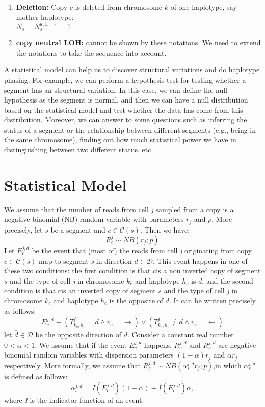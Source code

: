 \documentclass[12pt]{article}
\renewcommand{\c}{c} %
\newcommand{\C}{\mathcal{C}} %
\newcommand{\CN}{N} %
\renewcommand{\i}{v} %
\newcommand{\RC}{R} %
\renewcommand{\d}{d} %
\newcommand{\D}{\mathcal{D}} %
\newcommand{\chr}{k}
\newcommand{\h}{h} %
\newcommand{\T}{T} %
\begin{document}
\begin{enumerate}
\item \textbf{Deletion:} Copy $\c$ is deleted from chromosome $\chr$ of one haplotype, say mother haplotype:\\
$\CN_s = \CN_s^{\chr,1,\rightarrow} = 1$

\item \textbf{copy neutral LOH:} cannot be shown by these notations. We need to extend the notations to take the sequence into account.
\end{enumerate}

A statistical model can help us to discover structural variations and do haplotype phasing. For example, we can perform a hypothesis test for testing whether a segment has an structural variation. In this case, we can define the null hypothesis as the segment is normal, and then we can have a null distribution based on the statistical model and test whether the data has come from this distribution. Moreover, we can answer to some questions such as inferring the status of a segment or the relationship between different segments (e.g., being in the same chromosome), finding out how much statistical power we have in distinguishing between two different status, etc.

\section{Statistical Model}

We assume that the number of reads from cell \textit{j} sampled from a copy is a negative binomial (NB) random variable with parameters $r_j$ and $p$. More precisely, let $s$ be a segment and $\c \in \C(s)$. Then we have:
$$
\RC_\c^j \sim NB(r_j;p)
$$
Let $E_\c^{j,\d}$ be the event that (most of) the reads from cell \textit{j} originating from copy $\c \in \C(s)$ map to segment \textit{s} in direction $\d \in \D$. This event happens in one of these two conditions: the first condition is that \c is a non inverted copy of segment $s$ and the type of cell \textit{j} in chromosome $\chr_\c$ and haplotype $\h_\c$ is $\d$, and the second condition is that \c is an inverted copy of segment $s$ and the type of cell \textit{j} in chromosome $\chr_\c$ and haplotype $\h_\c$ is the opposite of $\d$. It can be written precisely as follows:
$$
E_\c^{j,\d} \equiv (\T_{\chr_\c,\h_\c}^j = \d \wedge \i_\c = \rightarrow) \vee (\T_{\chr_\c,\h_\c}^j \neq \d \wedge \i_\c = \leftarrow)
$$
let $\bar{\d} \in \D$ be the opposite direction of $\d$. Consider a constant real number $0 < \alpha < 1$. We assume that if the event $E_\c^{j,\d}$ happens, $\RC_\c^{j,\d}$ and $\RC_\c^{j,\bar{\d}}$ are negative binomial random variables with dispersion parameters $(1-\alpha) r_j$ and $\alpha r_j$ respectively. More formally, we assume that $\RC_\c^{j,\d} \sim NB(\alpha_s^{j,\d} r_j; p)$,in which $\alpha_s^{j,\d}$ is defined as follows:
$$
\alpha_s^{j,\d} = I(E_\c^{j,\d})(1-\alpha) + I(E_\c^{j,\bar{\d}})\alpha,
$$
where \textit{I} is the indicator function of an event.
\end{document}
